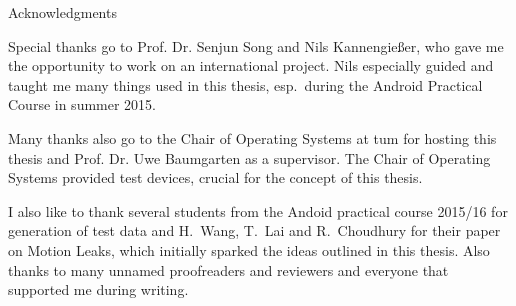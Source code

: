 \thispagestyle{empty}

\vspace*{2cm}

\begin{center}
{ Acknowledgments}
\end{center}

\vspace{1cm}

Special thanks go to Prof. Dr. Senjun Song and Nils Kannengießer, who gave me the opportunity to work on an international project. Nils especially guided and taught me many things used in this thesis, esp.\ during the Android Practical Course in summer 2015.

Many thanks also go to the Chair of Operating Systems at \gls{tum} for hosting this thesis and Prof. Dr. Uwe Baumgarten as a supervisor. The Chair of Operating Systems provided test devices, crucial for the concept of this thesis.

I also like to thank several students from the Andoid practical course 2015/16 for generation of test data and H.\ Wang, T.\ Lai and R.\ Choudhury for their paper on Motion Leaks\cite{wang2015mole}, which initially sparked the ideas outlined in this thesis. Also thanks to many unnamed proofreaders and reviewers and everyone that supported me during writing.

\cleardoublepage{}
